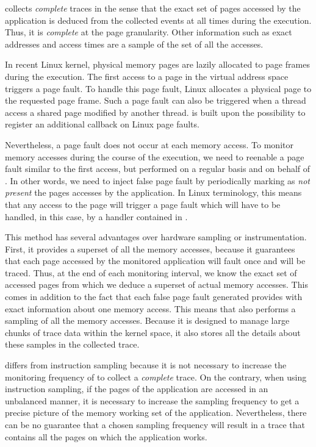 \Moca collects \emph{complete} traces in the sense that the exact set
of pages accessed by the application is deduced from the collected events
at all times during the execution. Thus, it is \emph{complete} at the page granularity.
Other information such as exact addresses and access times are a sample of
the set of all the accesses.

In recent Linux kernel, physical memory pages are lazily allocated to page frames during
the execution. The first access to a page in the virtual address space triggers a page fault.
To handle this page fault, Linux allocates a physical page to the requested page frame.
Such a page fault can also be triggered when a thread access a shared page modified by
another thread. \Moca is built upon the possibility to register an additional callback on Linux page faults.

Nevertheless, a page fault does not occur at each memory access. To monitor memory accesses during
the course of the execution, we need to reenable a page fault similar to the first access, but
performed on a regular basis and on behalf of \Moca.
In other words, we need to inject false page fault by periodically marking as \emph{not present}
the pages accesses by the application.
In Linux terminology, this means that any access to the page will trigger a page fault which
will have to be handled, in this case, by a handler contained in \Moca.

This method has several advantages over hardware sampling or
instrumentation. First, it provides a superset of all the memory accesses, because it
guarantees that each page accessed by the monitored application will fault once
and will be traced. Thus, at the end of each monitoring interval, we know the exact set
of accessed pages from which we deduce a superset of actual memory accesses.
This comes in addition to the fact that each false page fault generated provides \Moca with
exact information about one memory access. This means that \Moca also performs a sampling
of all the memory accesses. Because it is designed to manage large chunks of trace data
within the kernel space, it also stores all the details about these samples in the collected trace.

\Moca differs from instruction sampling because it is not necessary to increase the monitoring
frequency of \Moca to collect a \emph{complete} trace. On the contrary, when using instruction sampling,
if the pages of the application are accessed in an unbalanced manner, it is necessary to increase
the sampling frequency to get a precise picture of the memory working set of the application.
Nevertheless, there can be no guarantee that a chosen sampling frequency will result in a trace
that contains all the pages on which the application works.

